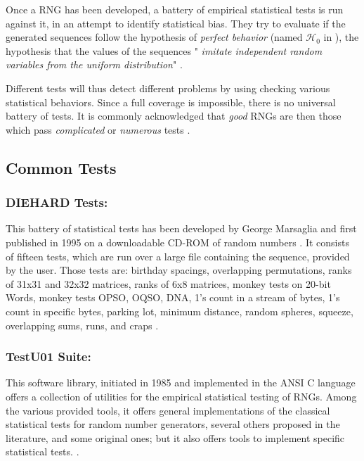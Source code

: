 \documentclass{llncs}
\begin{document}
Once a RNG has been developed, a battery of empirical statistical tests is run against it, in an attempt to identify statistical bias. They try to evaluate if the generated sequences follow the hypothesis of \emph{perfect behavior} (named $\mathcal{H}_0$ in \cite{lecu}), the hypothesis that the values of the sequences "\textit{ imitate independent random variables from the uniform distribution}" \cite{lecu}.

Different tests will thus detect different problems by using checking various statistical behaviors. Since a full coverage is impossible, there is no universal battery of tests. It is commonly acknowledged that \textit{good} RNGs are then those which pass \textit{complicated} or \textit{numerous} tests \cite{ritt,lecu}. 


\subsection{Common Tests}


\subsubsection{DIEHARD Tests:} 

This battery of statistical tests has been developed by George Marsaglia and first published in 1995 on a downloadable CD-ROM of random numbers \cite{marsa}. It consists of fifteen tests, which are run over a large file containing the sequence, provided by the user. Those tests are: birthday spacings, overlapping permutations, ranks of 31x31 and 32x32 matrices, ranks of 6x8 matrices, monkey tests on 20-bit Words, monkey tests OPSO, OQSO, DNA, 1's count in a stream of bytes, 1's count in specific bytes, parking lot, minimum distance, random spheres, squeeze, overlapping sums, runs, and craps \cite{soto}.

\subsubsection{TestU01 Suite:}
This software library, initiated in 1985 and implemented in the ANSI C language offers a collection of utilities for the empirical statistical testing of RNGs. Among the various provided tools, it offers general implementations of the classical statistical tests for random number generators, several others proposed in the literature, and some original ones; but it also offers tools to implement specific statistical tests. \cite{lecu}.
\end{document}
